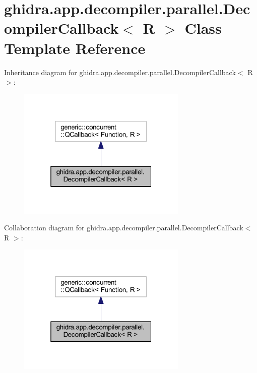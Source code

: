 \hypertarget{classghidra_1_1app_1_1decompiler_1_1parallel_1_1_decompiler_callback}{}\section{ghidra.\+app.\+decompiler.\+parallel.\+Decompiler\+Callback$<$ R $>$ Class Template Reference}
\label{classghidra_1_1app_1_1decompiler_1_1parallel_1_1_decompiler_callback}


Inheritance diagram for ghidra.\+app.\+decompiler.\+parallel.\+Decompiler\+Callback$<$ R $>$\+:
\nopagebreak
\begin{figure}[H]
\begin{center}
\leavevmode
\includegraphics[width=229pt]{classghidra_1_1app_1_1decompiler_1_1parallel_1_1_decompiler_callback__inherit__graph}
\end{center}
\end{figure}


Collaboration diagram for ghidra.\+app.\+decompiler.\+parallel.\+Decompiler\+Callback$<$ R $>$\+:
\nopagebreak
\begin{figure}[H]
\begin{center}
\leavevmode
\includegraphics[width=229pt]{classghidra_1_1app_1_1decompiler_1_1parallel_1_1_decompiler_callback__coll__graph}
\end{center}
\end{figure}
